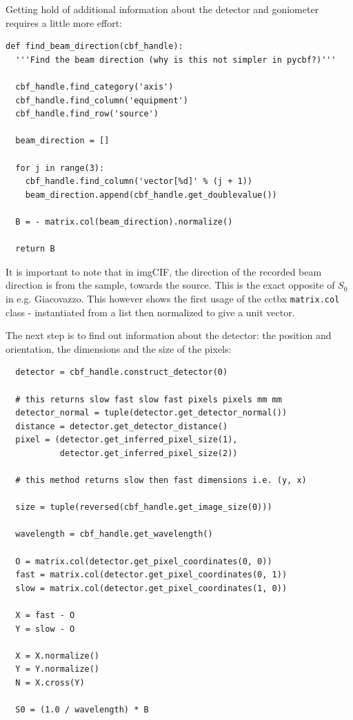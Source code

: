 \documentclass[a4paper, 11pt]{article}
\begin{document}
\noindent
Getting hold of additional information about the detector and goniometer requires a little more effort:

{\small
\begin{verbatim}
def find_beam_direction(cbf_handle):
  '''Find the beam direction (why is this not simpler in pycbf?)'''

  cbf_handle.find_category('axis')
  cbf_handle.find_column('equipment')
  cbf_handle.find_row('source')

  beam_direction = []

  for j in range(3):
    cbf_handle.find_column('vector[%d]' % (j + 1))
    beam_direction.append(cbf_handle.get_doublevalue())

  B = - matrix.col(beam_direction).normalize()

  return B
\end{verbatim}
}

\noindent
It is important to note that in imgCIF, the direction of the recorded beam direction is from the sample, towards the source. This is the exact opposite of $S_0$ in e.g. Giacovazzo. This however shows the first usage of the cctbx \verb|matrix.col| class - instantiated from a list then normalized to give a unit vector.

The next step is to find out information about the detector: the position and orientation, the dimensions and the size of the pixels:

{\small
\begin{verbatim}
  detector = cbf_handle.construct_detector(0)

  # this returns slow fast slow fast pixels pixels mm mm
  detector_normal = tuple(detector.get_detector_normal())
  distance = detector.get_detector_distance()
  pixel = (detector.get_inferred_pixel_size(1),
           detector.get_inferred_pixel_size(2))

  # this method returns slow then fast dimensions i.e. (y, x)

  size = tuple(reversed(cbf_handle.get_image_size(0)))

  wavelength = cbf_handle.get_wavelength()

  O = matrix.col(detector.get_pixel_coordinates(0, 0))
  fast = matrix.col(detector.get_pixel_coordinates(0, 1))
  slow = matrix.col(detector.get_pixel_coordinates(1, 0))

  X = fast - O
  Y = slow - O

  X = X.normalize()
  Y = Y.normalize()
  N = X.cross(Y)

  S0 = (1.0 / wavelength) * B
\end{verbatim}
}
\end{document}
